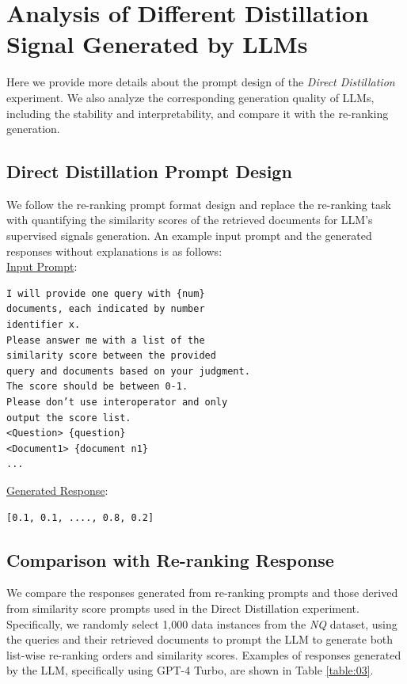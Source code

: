\section{Analysis of Different Distillation Signal Generated by LLMs}
\label{sec:appendix-A}
Here we provide more details about the prompt design of the \textit{Direct Distillation} experiment.
We also analyze the corresponding generation quality of LLMs, including the stability and interpretability, and compare it with the re-ranking generation.

\subsection{Direct Distillation Prompt Design}
We follow the re-ranking prompt format design and replace the re-ranking task with quantifying the similarity scores of the retrieved documents for LLM's supervised signals generation. An example input prompt and the generated responses without explanations is as follows:\\
\newline
\underline{Input Prompt}:
\begin{verbatim}
I will provide one query with {num} 
documents, each indicated by number 
identifier x. 
Please answer me with a list of the
similarity score between the provided 
query and documents based on your judgment. 
The score should be between 0-1. 
Please don’t use interoperator and only 
output the score list.
<Question> {question} 
<Document1> {document n1} 
...
\end{verbatim}
\underline{Generated Response}:
\begin{verbatim}
[0.1, 0.1, ...., 0.8, 0.2]
\end{verbatim}

\subsection{Comparison with Re-ranking Response}
We compare the responses generated from re-ranking prompts and those derived from similarity score prompts used in the Direct Distillation experiment. 
Specifically, we randomly select 1,000 data instances from the \textit{NQ} dataset, using the queries and their retrieved documents to prompt the LLM to generate both list-wise re-ranking orders and similarity scores.
Examples of responses generated by the LLM, specifically using GPT-4 Turbo, are shown in Table \ref{table:03}.

